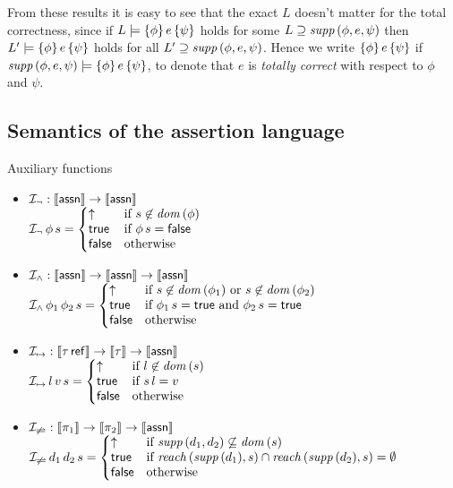 \documentclass[12pt,a4paper]{report}
\newcommand{\I}{\mathcal{I}}
\begin{document}
From these results it is easy to see that the exact $L$ doesn't matter for the total correctness, since
if $L\models\{\phi\}\,e\,\{\psi\}$ holds for some $L \supseteq \mathit{supp}\,(\phi,e,\psi)$
then $L'\models\{\phi\}\,e\,\{\psi\}$ holds for all $L'\supseteq \mathit{supp}\,(\phi,e,\psi)$.
Hence we write $\{\phi\}\,e\,\{\psi\}$ if $\mathit{supp}\,(\phi,e,\psi)\models\{\phi\}\,e\,\{\psi\}$,
to denote that $e$ is {\em totally correct} with respect to $\phi$ and $\psi$.



\subsection{Semantics of the assertion language}

\noindent Auxiliary functions
\begin{itemize}
  \item $\I_\neg: \semantic{\tassn} \to \semantic{\tassn}$ \\[1ex]
        $\I_\neg\,\phi\,s =
          \bcase
            \uparrow  & \text{if } s \not\in \dom{\phi} \\
            \true     & \text{if } \phi\,s=\false \\
            \false    & \text{otherwise}
          \ecase$

  \item $\I_\wedge: \semantic{\tassn} \to \semantic{\tassn} \to \semantic{\tassn}$ \\[1ex]
        $\I_\wedge\,\phi_1\,\phi_2\,s =
          \bcase
            \uparrow  & \text{if } s \not\in \dom{\phi_1} \text{ or } s \not\in \dom{\phi_2} \\
            \true     & \text{if } \phi_1\,s=\true \text{ and } \phi_2\,s=\true \\
            \false    & \text{otherwise}
          \ecase$

  \item $\I_{\mapsto}: \semantic{\tref{\tau}} \to \semantic{\tau} \to \semantic{\tassn}$ \\[1ex]
        $\I_{\mapsto}\,l\,v\,s =
          \bcase
            \uparrow  & \text{if } l \not\in \dom{s} \\
            \true     & \text{if } s\,l = v \\
            \false    & \text{otherwise}
          \ecase$

  \item $\I_{\not\rightleftharpoons}: \semantic{\pi_1} \to \semantic{\pi_2} \to \semantic{\tassn}$ \\[1ex]
        $\I_{\not\rightleftharpoons}\,d_1\,d_2\,s =
          \bcase
            \uparrow  & \text{if } \supp{d_1,d_2} \not\subseteq \dom{s} \\
            \true     & \text{if } \reach{\supp{d_1}}{s} \cap \reach{\supp{d_2}}{s} = \emptyset \\
            \false    & \text{otherwise}
          \ecase$
  

\end{itemize}
\end{document}
